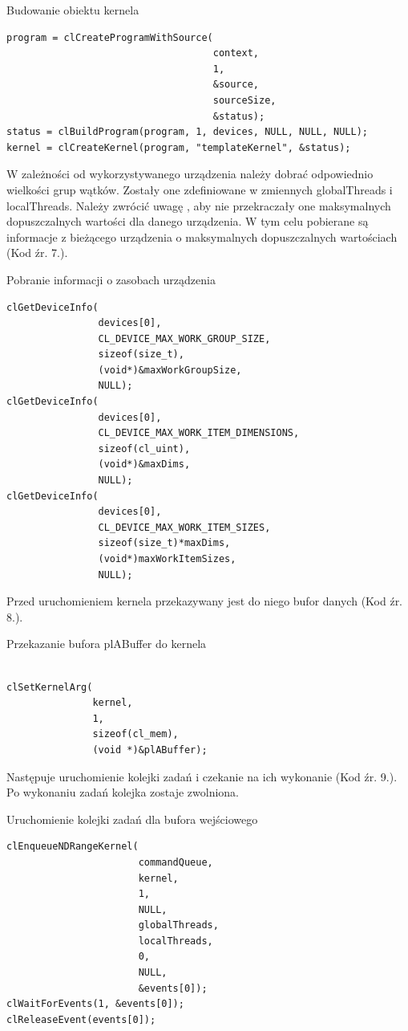 \begin{program}
\caption{Budowanie obiektu kernela}
\begin{lstlisting}
program = clCreateProgramWithSource(
                                    context, 
                                    1, 
                                    &source,
                                    sourceSize,
                                    &status);
status = clBuildProgram(program, 1, devices, NULL, NULL, NULL);
kernel = clCreateKernel(program, "templateKernel", &status);
\end{lstlisting}
\end{program}
W zależności od wykorzystywanego urządzenia należy dobrać odpowiednio wielkości grup wątków. Zostały one zdefiniowane w zmiennych globalThreads i localThreads. Należy zwrócić uwagę , aby nie przekraczały one maksymalnych dopuszczalnych wartości dla danego urządzenia. W tym celu pobierane są informacje z bieżącego urządzenia o maksymalnych dopuszczalnych wartościach (Kod źr. 7.).
\begin{program}
\caption{Pobranie informacji o zasobach urządzenia}
\begin{lstlisting}
clGetDeviceInfo(
                devices[0], 
                CL_DEVICE_MAX_WORK_GROUP_SIZE, 
                sizeof(size_t), 
                (void*)&maxWorkGroupSize, 
                NULL);
clGetDeviceInfo(
                devices[0], 
                CL_DEVICE_MAX_WORK_ITEM_DIMENSIONS, 
                sizeof(cl_uint), 
                (void*)&maxDims, 
                NULL);
clGetDeviceInfo(
                devices[0], 
                CL_DEVICE_MAX_WORK_ITEM_SIZES, 
                sizeof(size_t)*maxDims,
                (void*)maxWorkItemSizes,
                NULL);
\end{lstlisting}
\end{program}
Przed uruchomieniem kernela przekazywany jest do niego bufor danych (Kod źr. 8.).
\begin{program}
\caption{Przekazanie bufora plABuffer do kernela}
\begin{lstlisting}

clSetKernelArg(
               kernel, 
               1, 
               sizeof(cl_mem), 
               (void *)&plABuffer);
\end{lstlisting}
\end{program}
Następuje uruchomienie kolejki zadań i czekanie na ich wykonanie (Kod źr. 9.). Po wykonaniu zadań kolejka zostaje zwolniona.
\begin{program}
\caption{Uruchomienie kolejki zadań dla bufora wejściowego}
\begin{lstlisting}
clEnqueueNDRangeKernel(
                       commandQueue,
                       kernel,
                       1,
                       NULL,
                       globalThreads,
                       localThreads,
                       0,
                       NULL,
                       &events[0]);
clWaitForEvents(1, &events[0]);
clReleaseEvent(events[0]);
\end{lstlisting}
\end{program}
